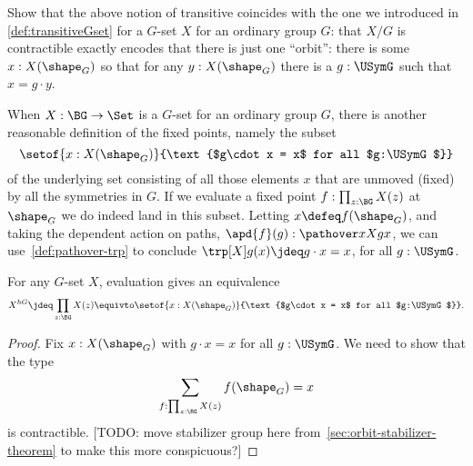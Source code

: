 \begin{xca}
  Show that the above notion of transitive coincides with the one we introduced in \cref{def:transitiveGset} for a $G$-set $X$ for an ordinary group $G$:
  that $X/G$ is contractible exactly encodes that there is just one ``orbit'':
  there is some $x:X(\shape_G)$ so that for any $y:X(\shape_G)$
  there is a $g:\USymG$ such that $x=g\cdot y$.
\end{xca}

When $X : \BG \to \Set$ is a $G$-set for an ordinary group $G$,
there is another reasonable definition of the fixed points,
namely the subset
\[
  \setof{x : X(\shape_G)}{\text{$g\cdot x = x$ for all $g:\USymG$}}
\]
of the underlying set consisting of all those elements $x$ that
are unmoved (\ie fixed) by all the symmetries in $G$.
If we evaluate a fixed point $f : \prod_{z:\BG}X(z)$ at $\shape_G$
we do indeed land in this subset. Letting $x\defeq f(\shape_G)$,
and taking the dependent action on paths,
$\apd{f}(g) : \pathover x X g x$,
we can use~\cref{def:pathover-trp} to conclude
$\trp[X] g(x)\jdeq g\cdot x = x$, for all $g:\USymG$.
\begin{lemma}\label{lem:fixpts-are-fixed}
  For any $G$-set $X$, evaluation gives an equivalence
  \[
    X^{hG} \jdeq \prod_{z:\BG}X(z) \equivto
    \setof{x : X(\shape_G)}{\text{$g\cdot x = x$ for all $g:\USymG$}}.
  \]
\end{lemma}
\begin{proof}
  Fix $x : X(\shape_G)$ with $g\cdot x = x$ for all $g: \USymG$.
  We need to show that the type
  \[
    \sum_{f : \prod_{z:\BG}X(z)}f(\shape_G)=x
  \]
  is contractible. [TODO: move stabilizer group here
  from~\cref{sec:orbit-stabilizer-theorem}
  to make this more conspicuous?]
\end{proof}

